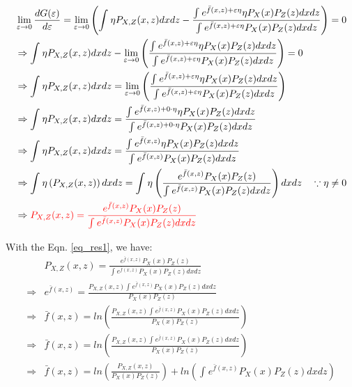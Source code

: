 \documentclass[UTF8]{article}
\newcommand{\refequ}[1]{Eqn. \ref{#1}}
\begin{document}
\begin{equation}
    \label{eq_res1}
    \begin{split}
        & \lim_{\varepsilon \to 0} \frac{d G(\varepsilon)}{d \varepsilon}  = \lim_{\varepsilon \to 0} \left( \int_{}^{}    \eta  P_{X,Z}(x,z)dxdz  -  \frac{\int_{}^{} e^{\bar{f}(x,z)+\varepsilon \eta} \eta P_X(x)P_Z(z)dxdz}{\int_{}^{}e^{\bar{f}(x,z)+\varepsilon \eta}P_X(x)P_Z(z)dxdz} \right) = 0 \\
        & \Rightarrow \int_{}^{}    \eta  P_{X,Z}(x,z)dxdz  -  \lim_{\varepsilon \to 0} \left(\frac{\int_{}^{} e^{\bar{f}(x,z)+\varepsilon \eta} \eta P_X(x)P_Z(z)dxdz}{\int_{}^{}e^{\bar{f}(x,z)+\varepsilon \eta}P_X(x)P_Z(z)dxdz} \right) = 0 \\
        & \Rightarrow \int_{}^{}    \eta  P_{X,Z}(x,z)dxdz  =  \lim_{\varepsilon \to 0} \left(\frac{\int_{}^{} e^{\bar{f}(x,z)+\varepsilon \eta} \eta P_X(x)P_Z(z)dxdz}{\int_{}^{}e^{\bar{f}(x,z)+\varepsilon \eta}P_X(x)P_Z(z)dxdz} \right) \\
        & \Rightarrow \int_{}^{}    \eta  P_{X,Z}(x,z)dxdz  =  \frac{\int_{}^{} e^{\bar{f}(x,z)+0\cdot \eta} \eta P_X(x)P_Z(z)dxdz}{\int_{}^{}e^{\bar{f}(x,z)+0 \cdot \eta}P_X(x)P_Z(z)dxdz} \\
        & \Rightarrow \int_{}^{}    \eta  P_{X,Z}(x,z)dxdz  =  \frac{\int_{}^{} e^{\bar{f}(x,z)} \eta P_X(x)P_Z(z)dxdz}{\int_{}^{}e^{\bar{f}(x,z)}P_X(x)P_Z(z)dxdz} \\
        & \Rightarrow \int_{}^{}    \eta  \left( P_{X,Z}(x,z) \right) dxdz  =\int_{}^{}    \eta \left( \frac{ e^{\bar{f}(x,z)}  P_X(x)P_Z(z)}{\int_{}^{}e^{\bar{f}(x,z)}P_X(x)P_Z(z)dxdz}\right) dxdz \quad \because \eta \neq 0  \\ 
        & \Rightarrow  \textcolor{red}{ P_{X,Z}(x,z) = \frac{ e^{\bar{f}(x,z)}  P_X(x)P_Z(z)}{\int_{}^{}e^{\bar{f}(x,z)}P_X(x)P_Z(z)dxdz} }
    \end{split}
\end{equation}

With the \refequ{eq_res1}, we have:
\begin{equation}
    \begin{split}
        & P_{X,Z}(x,z) = \frac{ e^{\bar{f}(x,z)}  P_X(x)P_Z(z)}{\int_{}^{}e^{\bar{f}(x,z)}P_X(x)P_Z(z)dxdz} \\
        \Rightarrow & e^{\bar{f}(x,z)} = \frac{P_{X,Z}(x,z) \int_{}^{}e^{\bar{f}(x,z)}P_X(x)P_Z(z)dxdz }{P_X(x)P_Z(z)} \\
        \Rightarrow & \bar{f}(x,z) = ln \left( \frac{P_{X,Z}(x,z) \int_{}^{}e^{\bar{f}(x,z)}P_X(x)P_Z(z)dxdz }{P_X(x)P_Z(z)} \right) \\
        \Rightarrow & \bar{f}(x,z) = ln \left( \frac{P_{X,Z}(x,z) \int_{}^{}e^{\bar{f}(x,z)}P_X(x)P_Z(z)dxdz }{P_X(x)P_Z(z)} \right) \\
        \Rightarrow & \bar{f}(x,z) = ln \left( \frac{P_{X,Z}(x,z) }{P_X(x)P_Z(z)} \right) + ln\left(\int_{}^{}e^{\bar{f}(x,z)}P_X(x)P_Z(z)dxdz  \right)
    \end{split}
\end{equation}
\end{document}
